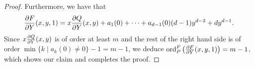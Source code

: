 \begin{proof}
	Furthermore, we have that
	\begin{equation*}
		\frac{\partial F}{\partial Y}(x, y, 1) = x\frac{\partial Q}{\partial Y}(x, y)
		+ a_1(0) + \dots + a_{d-1}(0)(d-1)y^{d-2} + dy^{d-1}.
	\end{equation*}
	Since $x\frac{\partial Q}{\partial Y}(x, y)$ is of order at least $m$ and
	the rest of the right hand side is of order
	$\min\{k \mid a_k(0) \neq 0\} - 1 = m - 1$, we deduce
	$\operatorname{ord}_P^F\left(\frac{\partial F}{\partial Y}(x, y, 1)\right) = m - 1$, which shows our
	claim and completes the proof.
 \end{proof} 


